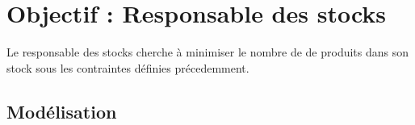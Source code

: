\newpage
\section{Objectif : Responsable des stocks}
Le responsable des stocks cherche à minimiser le nombre de de produits dans
son stock sous les contraintes définies précedemment.

\subsection{Modélisation}